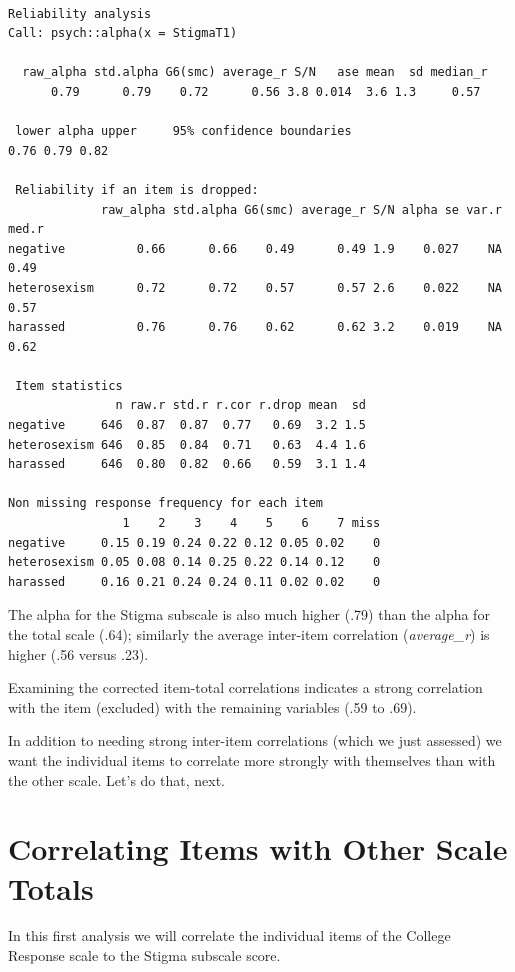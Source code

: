 \documentclass[
  english,
]{book}
\begin{document}
\begin{verbatim}

Reliability analysis   
Call: psych::alpha(x = StigmaT1)

  raw_alpha std.alpha G6(smc) average_r S/N   ase mean  sd median_r
      0.79      0.79    0.72      0.56 3.8 0.014  3.6 1.3     0.57

 lower alpha upper     95% confidence boundaries
0.76 0.79 0.82 

 Reliability if an item is dropped:
             raw_alpha std.alpha G6(smc) average_r S/N alpha se var.r med.r
negative          0.66      0.66    0.49      0.49 1.9    0.027    NA  0.49
heterosexism      0.72      0.72    0.57      0.57 2.6    0.022    NA  0.57
harassed          0.76      0.76    0.62      0.62 3.2    0.019    NA  0.62

 Item statistics 
               n raw.r std.r r.cor r.drop mean  sd
negative     646  0.87  0.87  0.77   0.69  3.2 1.5
heterosexism 646  0.85  0.84  0.71   0.63  4.4 1.6
harassed     646  0.80  0.82  0.66   0.59  3.1 1.4

Non missing response frequency for each item
                1    2    3    4    5    6    7 miss
negative     0.15 0.19 0.24 0.22 0.12 0.05 0.02    0
heterosexism 0.05 0.08 0.14 0.25 0.22 0.14 0.12    0
harassed     0.16 0.21 0.24 0.24 0.11 0.02 0.02    0
\end{verbatim}

The alpha for the Stigma subscale is also much higher (.79) than the alpha for the total scale (.64); similarly the average inter-item correlation (\emph{average\_r}) is higher (.56 versus .23).

Examining the corrected item-total correlations indicates a strong correlation with the item (excluded) with the remaining variables (.59 to .69).

In addition to needing strong inter-item correlations (which we just assessed) we want the individual items to correlate more strongly with themselves than with the other scale. Let's do that, next.

\hypertarget{correlating-items-with-other-scale-totals}{%
\section{Correlating Items with Other Scale Totals}\label{correlating-items-with-other-scale-totals}}

In this first analysis we will correlate the individual items of the College Response scale to the Stigma subscale score.
\end{document}
